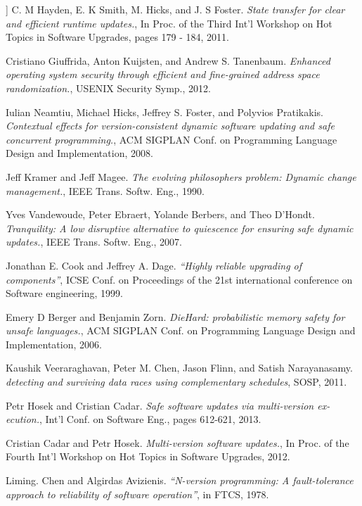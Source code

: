 \documentclass[a4paper,11pt,twoside]{article}
\begin{document}
\begin{thebibliography}{1}
   ] C. M Hayden, E. K Smith, M. Hicks, and J. S Foster. {\em State transfer for clear and efficient runtime updates.}, In Proc. of the Third Int’l Workshop on Hot Topics in Software Upgrades, pages 179 - 184, 2011.

   Cristiano Giuffrida, Anton Kuijsten, and Andrew S. Tanenbaum. {\em Enhanced operating system security through efficient and fine-grained address space randomization.}, USENIX Security Symp., 2012.

   Iulian Neamtiu, Michael Hicks, Jeffrey S. Foster, and Polyvios Pratikakis. {\em Contextual effects for version-consistent dynamic software updating and safe concurrent programming.}, ACM SIGPLAN Conf. on Programming Language Design and Implementation, 2008. 

   Jeff Kramer and Jeff Magee. {\em The evolving philosophers problem: Dynamic change management.}, IEEE Trans. Softw. Eng., 1990. 

  Yves Vandewoude, Peter Ebraert, Yolande Berbers, and Theo D’Hondt. {\em Tranquility: A low disruptive alternative to quiescence for ensuring safe dynamic updates.}, IEEE Trans. Softw. Eng., 2007.

  Jonathan E. Cook and	Jeffrey A. Dage. {\em “Highly reliable upgrading of components”}, ICSE Conf. on Proceedings of the 21st international conference on Software engineering, 1999.

  Emery D Berger and Benjamin Zorn. {\em DieHard: probabilistic memory safety for unsafe languages.}, ACM SIGPLAN Conf. on Programming Language Design and Implementation, 2006.
 
  Kaushik Veeraraghavan, Peter M. Chen, Jason Flinn, and Satish Narayanasamy. {\em detecting and surviving data races using complementary schedules}, SOSP, 2011. 
 
  Petr Hosek and Cristian Cadar. {\em Safe software updates via multi-version ex- ecution.}, Int’l Conf. on Software Eng., pages 612-621, 2013.
 
  Cristian Cadar and Petr Hosek. {\em Multi-version software updates.}, In Proc. of the Fourth Int’l Workshop on Hot Topics in Software Upgrades, 2012.

 	 Liming. Chen and Algirdas Avizienis. {\em  “N-version programming: A fault-tolerance approach to reliability of software operation”}, in FTCS, 1978. 
   

\end{thebibliography}
\end{document}
